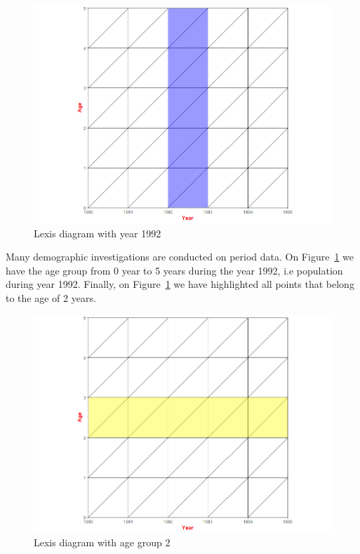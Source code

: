      \begin{figure}[tbh]
         \centering
          \includegraphics[scale=0.4]{figures/lexis_year.png}
          \caption{Lexis diagram with year 1992}
          \label{fig:lexis 4}
        \end{figure}
    
Many demographic investigations are conducted on period data. On Figure~\ref{fig:lexis 4} we have the age group from 0 year to 5 years during the year 1992, i.e population during year 1992. Finally, on Figure~\ref{fig:lexis 4} we have highlighted all points that belong to the age of 2 years.
     

             \begin{figure}[tbh]
         \centering
          \includegraphics[scale=0.4]{figures/lexis_age.png}
          \caption{Lexis diagram with age group 2}
          \label{fig:lexis 5}
        \end{figure} 
     
